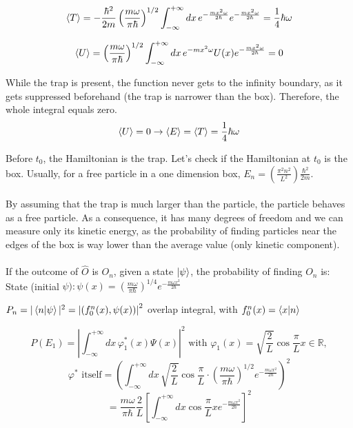 $$\expval{T} =-\frac{\hbar^{2}}{2 m}\left(\frac{m \omega}{\pi \hbar}\right)^{1 / 2} \int_{-\infty}^{+\infty} d x\, e^{-\frac{m x^{2} \omega}{2 \hbar}} e^{-\frac{m x^{2} \omega}{2 \hbar}}=\frac{1}{4} \hbar \omega$$

$$\expval{U} =\left(\frac{m \omega}{\pi \hbar}\right)^{1 / 2} \int_{-\infty}^{+\infty} d x\, e^{-m x^{2} \omega} U(x) e^{-\frac{m x^{2} \omega}{2 \hbar}}=0$$

\noindent
While the trap is present, the function never gets to the infinity boundary, as it gets suppressed beforehand (the trap is narrower than the box). 
Therefore, the whole integral equals zero.\\
$$\expval{U}=0 \rightarrow \expval{E}=\expval{T}=\frac{1}{4} \hbar \omega $$

\noindent
Before $t_0$, the Hamiltonian is the trap. 
Let's check if the Hamiltonian at $t_0$ is the box. 
Usually, for a free particle in a one dimension box,  $E_n=\left(\frac{\pi^{2}n^2}{L^2}\right)\frac{\hbar^{2}}{2 m}$.\\
\\
By assuming that the trap is much larger than the particle, the particle behaves as a free particle. 
As a consequence, it has many degrees of freedom and we can measure only its kinetic energy, as the probability of finding particles near the edges of the box is way lower than the average value (only kinetic component).\\
\\
\noindent
If the outcome of $\hat{O}$ is $O_n$, given a state $\ket{\psi}$, the probability of finding $O_n$ is:
\\
State (initial $\psi): \psi(x)=\left(\frac{m \omega}{ \pi \hbar}\right)^{1 / 4} e^{-\frac{m \omega x^{2}}{2 \hbar}}$

$P_{n}=|\bra{n} \ket{\psi}|^{2}=\left|\left(f_{0}^{n}(x), \psi(x)\right)\right|^{2}$ overlap integral, with $f_{0}^{n}(x)=\bra{x}\ket{n}$

\[P\left(E_{1}\right)=\left|\int_{-\infty}^{+\infty} d x\, \varphi_{1}^{*}(x) \Psi(x)\right|^{2}
\text{ with }
\varphi_{1}(x)=\sqrt{\frac{2}{L}} \cos \frac{\pi}{L}x \in \mathbb{R},\]
\[\varphi^{*} \text{ itself}
=\left(\int_{-\infty}^{+\infty} d x\,\sqrt{\frac{2}{L}} \cos \frac{\pi}{L} \cdot \left(\frac{m \omega}{ \pi \hbar}\right)^{1 / 2} e^{-\frac{m \omega x^{2}}{2 \hbar}}\right)^{2}
\]
$$=\frac{m \omega}{ \pi \hbar}\frac{2}{L} \left[\int_{-\infty}^{+\infty} d x \cos \frac{\pi}{L} x e^{-\frac{m \omega x^{2}}{2 \hbar}}\right]^{2}$$

